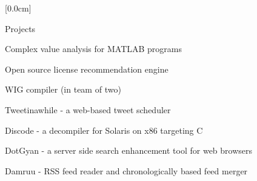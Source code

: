 \documentclass{resume} %
\begin{document}
[0.0cm]
\begin{rSection}{Projects}
\smallskip
\begin{lSubsection}
    \item Complex value analysis for MATLAB programs
    \item Open source license recommendation engine
    \item WIG compiler (in team of two)
    \item Tweetinawhile -  a web-based tweet scheduler
    \item Discode - a decompiler for Solaris on x86 targeting C
    \item DotGyan - a server side search enhancement tool for web browsers
    \item Damruu - RSS feed reader and chronologically based feed merger
\end{lSubsection}
\end{rSection}





\end{document}

